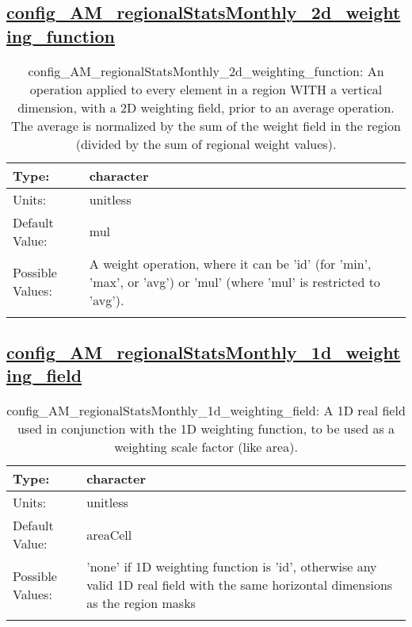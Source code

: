 \subsection[config\_AM\_regionalStatsMonthly\_2d\_weighting\_function]{\hyperref[sec:nm_tab_AM_regionalStatsMonthly]{config\_AM\_regionalStatsMonthly\_2d\_weighting\_function}}
\label{subsec:nm_sec_config_AM_regionalStatsMonthly_2d_weighting_function}
\begin{center}
\begin{longtable}{| p{2.0in} || p{4.0in} |}
    \hline
    Type: & character \\
    \hline
    Units: & \si{unitless} \\
    \hline
    Default Value: & mul \\
    \hline
    Possible Values: & A weight operation, where it can be 'id' (for 'min', 'max', or 'avg') or 'mul' (where 'mul' is restricted to 'avg'). \\
    \hline
    \caption{config\_AM\_regionalStatsMonthly\_2d\_weighting\_function: An operation applied to every element in a region WITH a vertical dimension, with a 2D weighting field, prior to an average operation. The average is normalized by the sum of the weight field in the region (divided by the sum of regional weight values).}
\end{longtable}
\end{center}
\subsection[config\_AM\_regionalStatsMonthly\_1d\_weighting\_field]{\hyperref[sec:nm_tab_AM_regionalStatsMonthly]{config\_AM\_regionalStatsMonthly\_1d\_weighting\_field}}
\label{subsec:nm_sec_config_AM_regionalStatsMonthly_1d_weighting_field}
\begin{center}
\begin{longtable}{| p{2.0in} || p{4.0in} |}
    \hline
    Type: & character \\
    \hline
    Units: & \si{unitless} \\
    \hline
    Default Value: & areaCell \\
    \hline
    Possible Values: & 'none' if 1D weighting function is 'id', otherwise any valid 1D real field with the same horizontal dimensions as the region masks \\
    \hline
    \caption{config\_AM\_regionalStatsMonthly\_1d\_weighting\_field: A 1D real field used in conjunction with the 1D weighting function, to be used as a weighting scale factor (like area).}
\end{longtable}
\end{center}
